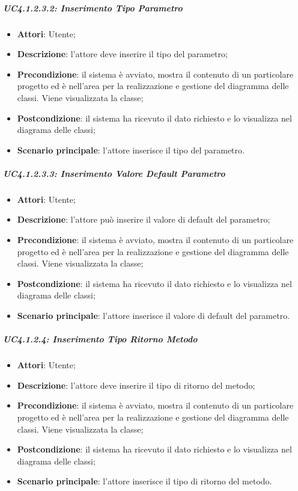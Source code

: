 \subparagraph{UC4.1.2.3.2: Inserimento Tipo Parametro}
\label{UC4.1.2.3.2}
\begin{itemize}
	\item \textbf{Attori}: Utente;
	\item \textbf{Descrizione}: l'attore deve inserire il tipo del parametro;
	\item \textbf{Precondizione}: il sistema è avviato, mostra il contenuto di un particolare progetto ed è nell'area per la realizzazione e gestione del diagramma delle classi. Viene visualizzata la classe;
	\item \textbf{Postcondizione}: il sistema ha ricevuto il dato richiesto e lo visualizza nel diagrama delle classi;
	\item \textbf{Scenario principale}: l'attore inserisce il tipo del parametro.
\end{itemize}

\subparagraph{UC4.1.2.3.3: Inserimento Valore Default Parametro}
\label{UC4.1.2.3.3}
\begin{itemize}
	\item \textbf{Attori}: Utente;
	\item \textbf{Descrizione}: l'attore può inserire il valore di default del parametro;
	\item \textbf{Precondizione}: il sistema è avviato, mostra il contenuto di un particolare progetto ed è nell'area per la realizzazione e gestione del diagramma delle classi. Viene visualizzata la classe;
	\item \textbf{Postcondizione}: il sistema ha ricevuto il dato richiesto e lo visualizza nel diagrama delle classi;
	\item \textbf{Scenario principale}: l'attore inserisce  il valore di default del parametro.
\end{itemize}

\subparagraph{UC4.1.2.4: Inserimento Tipo Ritorno Metodo}
\label{UC4.1.2.4}
\begin{itemize}
	\item \textbf{Attori}: Utente;
	\item \textbf{Descrizione}: l'attore deve inserire il tipo di ritorno del metodo;
	\item \textbf{Precondizione}: il sistema è avviato, mostra il contenuto di un particolare progetto ed è nell'area per la realizzazione e gestione del diagramma delle classi. Viene visualizzata la classe;
	\item \textbf{Postcondizione}: il sistema ha ricevuto il dato richiesto e lo visualizza nel diagrama delle classi;
	\item \textbf{Scenario principale}: l'attore inserisce il tipo di ritorno del metodo.
\end{itemize}

